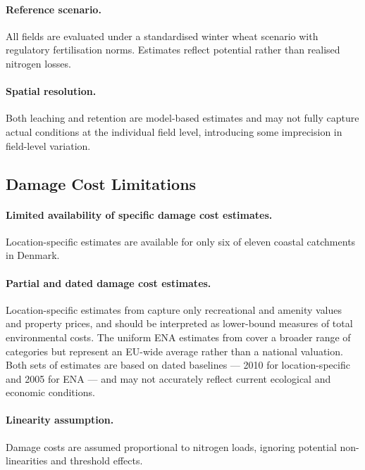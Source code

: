 \documentclass[12pt]{article}
\begin{document}
\paragraph{Reference scenario.}
All fields are evaluated under a standardised winter wheat scenario with regulatory fertilisation norms. 
Estimates reflect potential rather than realised nitrogen losses.

\paragraph{Spatial resolution.}
Both leaching and retention are model-based estimates and may not fully capture actual conditions at the individual field level, introducing some imprecision in field-level variation.


\subsection{Damage Cost Limitations}

\paragraph{Limited availability of specific damage cost estimates.} 
Location-specific estimates are available for only six of eleven coastal catchments in Denmark. 

\paragraph{Partial and dated damage cost estimates.} Location-specific estimates from \citet{andersen2019} capture only recreational and amenity values and property prices, and should be interpreted as lower-bound measures of total environmental costs. The uniform ENA estimates from \citet{brink2011} cover a broader range of categories but represent an EU-wide average rather than a national valuation. Both sets of estimates are based on dated 
baselines --- 2010 for location-specific and 2005 for ENA --- and may not accurately reflect current ecological and economic conditions.

\paragraph{Linearity assumption.}
Damage costs are assumed proportional to nitrogen loads, ignoring potential non-linearities and threshold effects.


\end{document}
